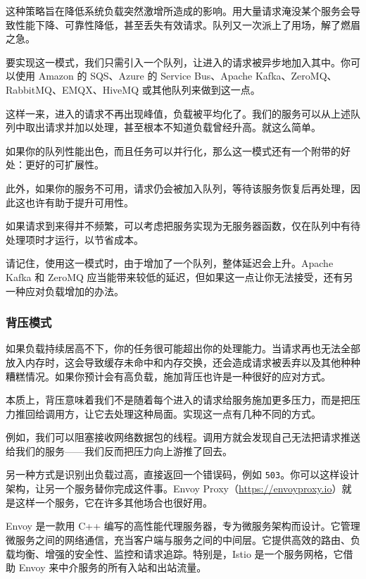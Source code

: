\label{idx:328}
\label{idx:329}
这种策略旨在降低系统负载突然激增所造成的影响。用大量请求淹没某个服务会导致性能下降、可靠性降低，甚至丢失有效请求。队列又一次派上了用场，解了燃眉之急。

要实现这一模式，我们只需引入一个队列，让进入的请求被异步地加入其中。你可以使用 Amazon 的 SQS、Azure 的 Service Bus、Apache Kafka、ZeroMQ、RabbitMQ、EMQX、HiveMQ 或其他队列来做到这一点。

这样一来，进入的请求不再出现峰值，负载被平均化了。我们的服务可以从上述队列中取出请求并加以处理，甚至根本不知道负载曾经升高。就这么简单。

如果你的队列性能出色，而且任务可以并行化，那么这一模式还有一个附带的好处：更好的可扩展性。

此外，如果你的服务不可用，请求仍会被加入队列，等待该服务恢复后再处理，因此这也许有助于提升可用性。

如果请求到来得并不频繁，可以考虑把服务实现为无服务器函数，仅在队列中有待处理项时才运行，以节省成本。

请记住，使用这一模式时，由于增加了一个队列，整体延迟会上升。Apache Kafka 和 ZeroMQ 应当能带来较低的延迟，但如果这一点让你无法接受，还有另一种应对负载增加的办法。

\subsubsection{背压模式}

\label{idx:330}
\label{idx:331}
如果负载持续居高不下，你的任务很可能超出你的处理能力。当请求再也无法全部放入内存时，这会导致缓存未命中和内存交换，还会造成请求被丢弃以及其他种种糟糕情况。如果你预计会有高负载，施加背压也许是一种很好的应对方式。

本质上，背压意味着我们不是随着每个进入的请求给服务施加更多压力，而是把压力推回给调用方，让它去处理这种局面。实现这一点有几种不同的方式。

例如，我们可以阻塞接收网络数据包的线程。调用方就会发现自己无法把请求推送给我们的服务——我们反而把压力向上游推了回去。

\label{idx:332}
\label{idx:333}
另一种方式是识别出负载过高，直接返回一个错误码，例如 \texttt{503}。你可以这样设计架构，让另一个服务替你完成这件事。Envoy Proxy（\href{https://envoyproxy.io}{https://envoyproxy.io}）就是这样一个服务，它在许多其他场合也很好用。

Envoy 是一款用 C++ 编写的高性能代理服务器，专为微服务架构而设计。它管理微服务之间的网络通信，充当客户端与服务之间的中间层。它提供高效的路由、负载均衡、增强的安全性、监控和请求追踪。特别是，Istio 是一个服务网格，它借助 Envoy 来中介服务的所有入站和出站流量。

